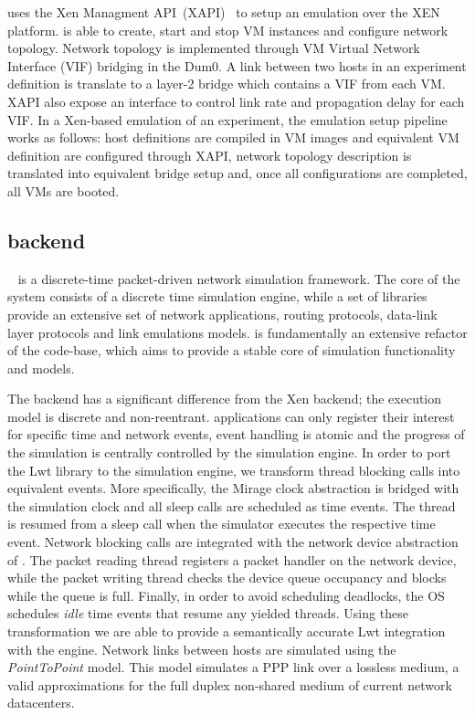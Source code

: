 \sdnsim uses the Xen Managment API~(XAPI)~\cite{xapi} to setup an emulation over
the XEN platform.  \sdnsim is able to create, start and stop VM instances and
configure network topology.  Network topology is implemented through VM Virtual
Network Interface (VIF) bridging in the Dum0. A link between two hosts in an
experiment definition is translate to a layer-2 bridge which contains a VIF from
each VM\@.  XAPI also expose an interface to control link rate and propagation
delay for each VIF\@. In a Xen-based emulation of an \sdnsim experiment, the
emulation setup pipeline works as follows: host definitions are compiled in VM
images and equivalent VM definition are configured through XAPI, network
topology description is translated into equivalent bridge setup and, once all
configurations are completed, all VMs are booted.

\subsection{ backend}

~\cite{Henderson2006} is a discrete-time packet-driven network simulation
framework. The core of the system consists of a discrete time simulation engine,
while a set of  libraries provide an extensive set of network
applications, routing protocols, data-link layer protocols and link emulations
models.  is fundamentally an extensive refactor of the  code-base,
which aims to provide a stable core of simulation functionality and models. 

The  backend has a significant difference from the Xen backend; the
execution model is discrete and non-reentrant.  applications can only
register their interest for specific time and network events, event handling is
atomic and the progress of the simulation is centrally controlled by the
simulation engine. In order to port the Lwt library to the  simulation
engine, we transform thread blocking calls into equivalent  events.  More
specifically, the Mirage clock abstraction is bridged with the  simulation
clock and all sleep calls are scheduled as  time events.  The thread is
resumed from a sleep call when the simulator executes the respective time event.
Network blocking calls are integrated with the network device abstraction of
.  The packet reading thread registers a packet handler on the network
device, while the packet writing thread checks the device queue occupancy and
blocks while the queue is full. Finally, in order to avoid scheduling deadlocks,
the OS schedules {\it idle} \/time events that resume any yielded threads. Using
these transformation we are able to provide a semantically accurate Lwt
integration with the  engine.  Network links between hosts are simulated
using the {\it PointToPoint} \/model. This model simulates a PPP link over a
lossless medium, a valid approximations for the full duplex non-shared medium of
current network datacenters.

